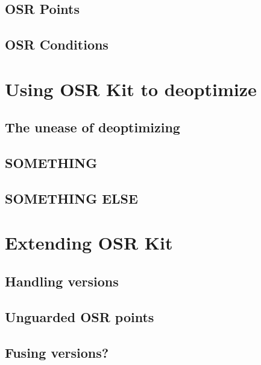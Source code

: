 \subsection{OSR Points}
\subsection{OSR Conditions}

\section{Using OSR Kit to deoptimize}
\subsection{The unease of deoptimizing}
\subsection{SOMETHING}
\subsection{SOMETHING ELSE}

\section{Extending OSR Kit}
\subsection{Handling versions}
\subsection{Unguarded OSR points}
\subsection{Fusing versions?}